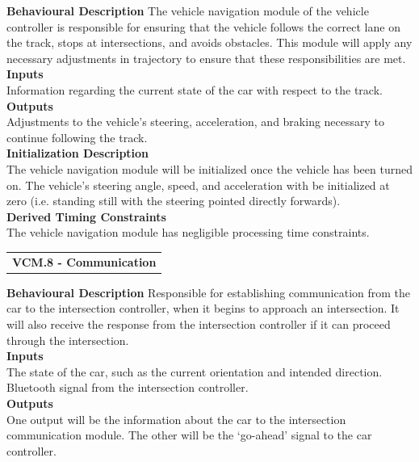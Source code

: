 \documentclass [10pt]{article}
\begin{document}
\textbf{Behavioural Description} 
    The vehicle navigation module of the vehicle controller is responsible for ensuring that the vehicle follows the correct lane on the track, stops at intersections, and avoids obstacles. This module will apply any necessary adjustments in trajectory to ensure that these responsibilities are met.\\

\textbf{Inputs} \\
Information regarding the current state of the car with respect to the track. \\

\textbf{Outputs} \\
 Adjustments to the vehicle's steering, acceleration, and braking necessary to continue following the track.\\

\textbf{Initialization Description} \\
The vehicle navigation module will be initialized once the vehicle has been turned on. The vehicle's steering angle, speed, and acceleration with be initialized at zero (i.e. standing still with the steering pointed directly forwards). \\

\textbf{Derived Timing Constraints} \\
The vehicle navigation module has negligible processing time constraints. \\

\begin{longtable}{p{}}
\rowcolor{tableCell}\textbf{VCM.8 - Communication} \\
\end{longtable}

\textbf{Behavioural Description} 
Responsible for establishing communication from the car to the intersection controller, when it begins to approach an intersection. It will also receive the response from the intersection controller if it can proceed through the intersection.
\\

\textbf{Inputs} \\
    The state of the car, such as the current orientation and intended direction. \\ Bluetooth signal from the intersection controller. \\

\textbf{Outputs} \\
    One output will be the information about the car to the intersection communication module. The other will be the `go-ahead' signal to the car controller.\\
\end{document}
